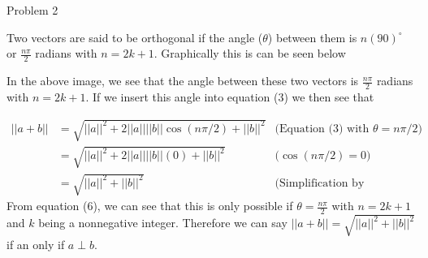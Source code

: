 \begin{problem}{Problem 2}
\begin{highlight}
        Two vectors are said to be orthogonal if the angle ($\theta$) between them is $n (90)^{\circ}$ or $\frac{n\pi}{2}$ radians with $n = 2k + 1$. Graphically this is can be seen below

        \begin{center}
            \hspace*{10pt}
        \end{center}

        In the above image, we see that the angle between these two vectors is $\frac{n\pi}{2}$ radians with $n = 2k + 1$. If we insert this angle into equation (3) we then see that

        \begin{align}
            ||a + b|| & = \sqrt{||a||^{2} + 2||a||||b||\cos{(n\pi / 2)} + ||b||^2} & \text{(Equation (3) with $\theta = n\pi / 2$)} \\
            & = \sqrt{||a||^{2} + 2||a||||b||(0) + ||b||^2} & \text{($\cos{(n\pi / 2)} = 0$)} \\
            & = \sqrt{||a||^{2} + ||b||^2} & \text{(Simplification by multiplication)}
        \end{align}
        From equation (6), we can see that this is only possible if $\theta = \frac{n\pi}{2}$ with $n = 2k + 1$ and $k$ being a nonnegative integer. Therefore we can say $||a+b|| = \sqrt{||a||^{2} + ||b||^{2}}$
        if an only if $a \perp b$. 
    \end{highlight}


\end{problem}
